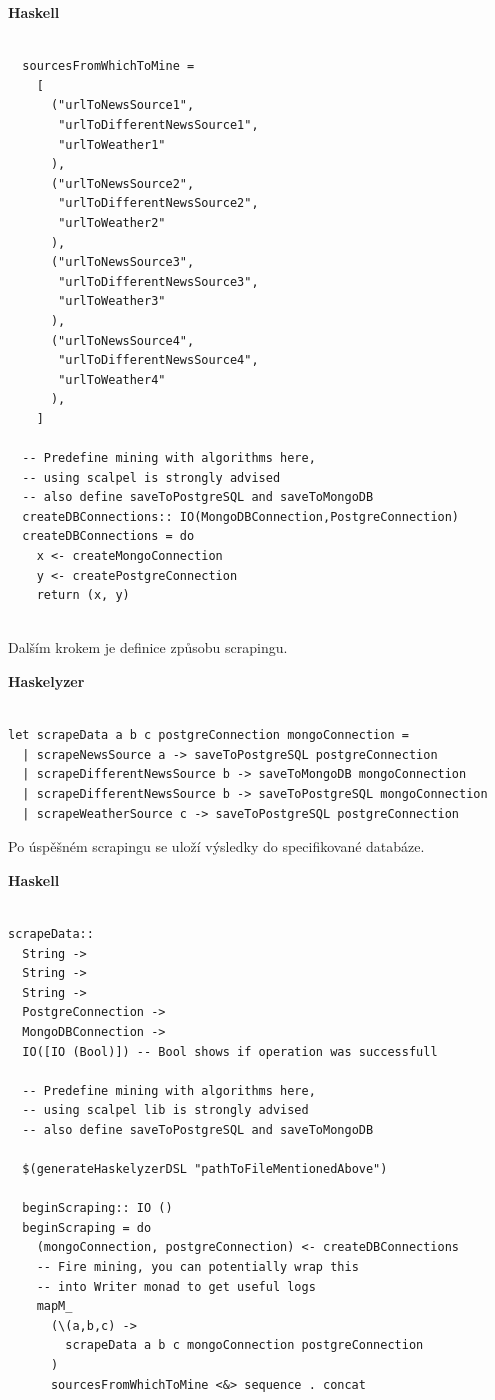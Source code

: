 \documentclass[male, czech]{kithesis}
\begin{document}
\newpage
\textbf{Haskell}
\begin{verbatim}

  sourcesFromWhichToMine = 
    [
      ("urlToNewsSource1", 
       "urlToDifferentNewsSource1",
       "urlToWeather1"
      ),
      ("urlToNewsSource2", 
       "urlToDifferentNewsSource2",
       "urlToWeather2"
      ),
      ("urlToNewsSource3", 
       "urlToDifferentNewsSource3",
       "urlToWeather3"
      ),
      ("urlToNewsSource4", 
       "urlToDifferentNewsSource4",
       "urlToWeather4"
      ),
    ]
  
  -- Predefine mining with algorithms here, 
  -- using scalpel is strongly advised
  -- also define saveToPostgreSQL and saveToMongoDB
  createDBConnections:: IO(MongoDBConnection,PostgreConnection)
  createDBConnections = do
    x <- createMongoConnection 
    y <- createPostgreConnection 
    return (x, y)
  
\end{verbatim}

Dalším krokem je definice způsobu scrapingu. 

\textbf{Haskelyzer}
\begin{verbatim}

let scrapeData a b c postgreConnection mongoConnection = 
  | scrapeNewsSource a -> saveToPostgreSQL postgreConnection
  | scrapeDifferentNewsSource b -> saveToMongoDB mongoConnection
  | scrapeDifferentNewsSource b -> saveToPostgreSQL mongoConnection
  | scrapeWeatherSource c -> saveToPostgreSQL postgreConnection

\end{verbatim}

Po úspěšném scrapingu se uloží výsledky do specifikované databáze.

\textbf{Haskell}
\begin{verbatim}

scrapeData:: 
  String -> 
  String -> 
  String -> 
  PostgreConnection -> 
  MongoDBConnection -> 
  IO([IO (Bool)]) -- Bool shows if operation was successfull

  -- Predefine mining with algorithms here, 
  -- using scalpel lib is strongly advised
  -- also define saveToPostgreSQL and saveToMongoDB

  $(generateHaskelyzerDSL "pathToFileMentionedAbove")

  beginScraping:: IO ()
  beginScraping = do
    (mongoConnection, postgreConnection) <- createDBConnections
    -- Fire mining, you can potentially wrap this 
    -- into Writer monad to get useful logs
    mapM_ 
      (\(a,b,c) -> 
        scrapeData a b c mongoConnection postgreConnection
      ) 
      sourcesFromWhichToMine <&> sequence . concat
\end{verbatim}
\newpage
\end{document}

